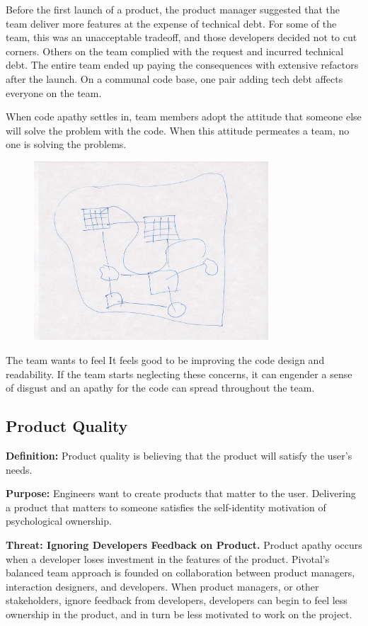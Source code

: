 Before the first launch of a product, the product manager suggested that the team deliver more features at the expense of technical debt. For some of the team, this was an unacceptable tradeoff, and those developers decided not to cut corners. Others on the team complied with the request and incurred technical debt. The entire team ended up paying the consequences with extensive refactors after the launch. On a communal code base, one pair adding tech debt affects everyone on the team.

When code apathy settles in, team members adopt the attitude that someone else will solve the problem with the code. When this attitude permeates a team, no one is solving the problems. 

\begin{figure}[t]
\centering
\includegraphics[width=3.45in]{CodeOwnership.jpg}
\caption{}
\label{Programmer1}
\end{figure}


The team wants to feel   It feels good to be improving the code design and readability. If the team starts neglecting these concerns, it can engender a sense of disgust and an apathy for the code can spread throughout the team.

\subsection{Product Quality}
\textbf{Definition:} Product quality is believing that the product will satisfy the user's needs.

\textbf{Purpose:} Engineers want to create products that matter to the user. Delivering a product that matters to someone satisfies the self-identity motivation of psychological ownership.

\textbf{Threat: Ignoring Developers Feedback on Product.} Product apathy occurs when a developer loses investment in the features of the product. Pivotal's balanced team approach is founded on collaboration between product managers, interaction designers, and developers. When product managers, or other stakeholders, ignore feedback from developers, developers can begin to feel less ownership in the product, and in turn be less motivated to work on the project. 

